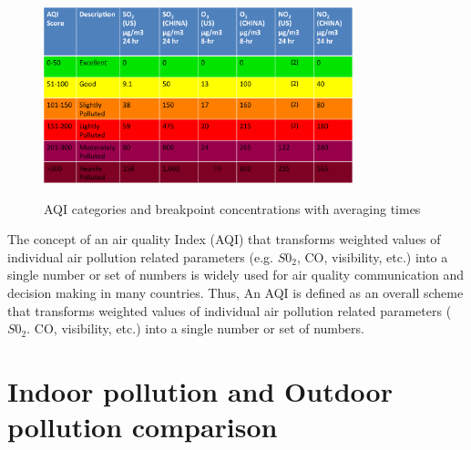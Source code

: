 \begin{figure}[h]
\centering
  \includegraphics[width=0.8\textwidth]{./AQI}\\[0.1in]
  \caption{AQI categories and breakpoint concentrations with averaging times}
  \label{fig:AQI Category Breakpoint}
\end{figure}


The concept of an air quality Index (AQI) that transforms weighted values of individual air pollution related parameters (e.g. $S0_2$, CO, visibility, etc.) into a single number or set of numbers is widely used for air quality communication and decision making in many countries. Thus, An AQI is defined as an overall scheme that transforms weighted values of individual air pollution related parameters ($S0_2$. CO, visibility, etc.) into a single number or set of numbers.

\section{Indoor pollution and Outdoor pollution comparison}

